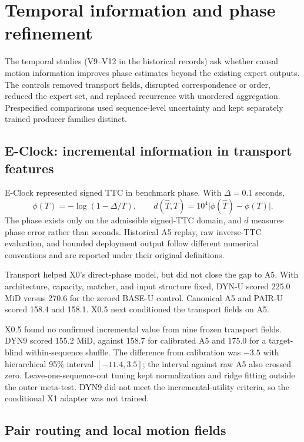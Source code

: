 \section{Temporal information and phase refinement}
\label{sec:temporal-recovery}

The temporal studies (V9--V12 in the historical records) ask whether causal motion information improves phase estimates beyond the existing expert outputs. The controls removed transport fields, disrupted correspondence or order, reduced the expert set, and replaced recurrence with unordered aggregation. Prespecified comparisons used sequence-level uncertainty and kept separately trained producer families distinct.

\subsection{E-Clock: incremental information in transport features}

E-Clock represented signed TTC in benchmark phase. With $\Delta=0.1$ seconds,
\begin{equation}
 \phi(T)=-\log(1-\Delta/T),\qquad
 d(\hat T,T)=10^4\lvert\phi(\hat T)-\phi(T)\rvert.
\end{equation}
The phase exists only on the admissible signed-TTC domain, and $d$ measures phase error rather than seconds. Historical A5 replay, raw inverse-TTC evaluation, and bounded deployment output follow different numerical conventions and are reported under their original definitions.

Transport helped X0's direct-phase model, but did not close the gap to A5. With architecture, capacity, matcher, and input structure fixed, DYN-U scored 225.0 MiD versus 270.6 for the zeroed BASE-U control. Canonical A5 and PAIR-U scored 158.4 and 158.1. X0.5 next conditioned the transport fields on A5.

X0.5 found no confirmed incremental value from nine frozen transport fields. DYN9 scored 155.2 MiD, against 158.7 for calibrated A5 and 175.0 for a target-blind within-sequence shuffle. The difference from calibration was $-3.5$ with hierarchical 95\% interval $[-11.4,3.5]$; the interval against raw A5 also crossed zero. Leave-one-sequence-out tuning kept normalization and ridge fitting outside the outer meta-test. DYN9 did not meet the incremental-utility criteria, so the conditional X1 adapter was not trained. 

\subsection{Pair routing and local motion fields}

